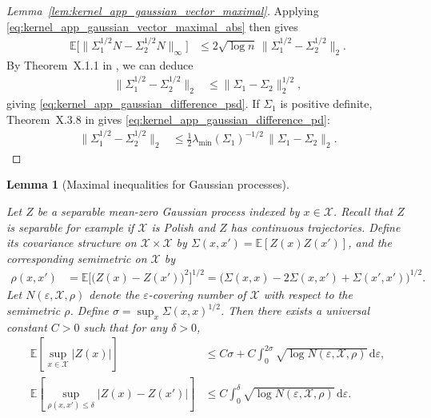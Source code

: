 \documentclass[11pt,lof]{puthesis}
\newcommand{\E}{\ensuremath{\mathbb{E}}}
\newcommand{\cX}{\ensuremath{\mathcal{X}}}
\newcommand{\diff}[1]{\,\mathrm{d}#1}
\theoremstyle{break}
\newtheorem{lemma}{Lemma}[section]
\theoremstyle{proof}
\newtheorem{proof}{Proof}
\begin{document}
\begin{proof}[Lemma~\ref{lem:kernel_app_gaussian_vector_maximal}]
  Applying
  \eqref{eq:kernel_app_gaussian_vector_maximal_abs}
  then gives
  \begin{align*}
    \E\Big[
      \big\|
      \Sigma_1^{1/2} N
      - \Sigma_2^{1/2} N
      \big\|_\infty
    \Big]
    &\leq
    2 \sqrt{\log n} \,
    \big\|
    \Sigma_1^{1/2} - \Sigma_2^{1/2}
    \big\|_2.
  \end{align*}
  By Theorem~X.1.1
  in \citet{bhatia1997matrix},
  we can deduce
  \begin{align*}
    \big\|
    \Sigma_1^{1/2} - \Sigma_2^{1/2}
    \big\|_2
    &\leq
    \big\|
    \Sigma_1 - \Sigma_2
    \big\|_2^{1/2},
  \end{align*}
  giving
  \eqref{eq:kernel_app_gaussian_difference_psd}.
  If $\Sigma_1$
  is positive definite,
  Theorem~X.3.8 in
  \citet{bhatia1997matrix} gives
  \eqref{eq:kernel_app_gaussian_difference_pd}:
  \begin{align*}
    \big\|
    \Sigma_1^{1/2} - \Sigma_2^{1/2}
    \big\|_2
    &\leq
    \frac{1}{2}
    \lambda_{\min}(\Sigma_1)^{-1/2} \,
    \big\|
    \Sigma_1 - \Sigma_2
    \big\|_2.
  \end{align*}
\end{proof}

\begin{lemma}[Maximal inequalities for Gaussian processes]
  \label{lem:kernel_app_gaussian_process_maximal}

  Let $Z$ be a separable
  mean-zero Gaussian process indexed
  by $x \in \cX$.
  Recall that $Z$ is separable for example if
  $\cX$ is Polish and $Z$ has
  continuous trajectories.
  Define its covariance structure on $\cX \times \cX$
  by $\Sigma(x, x') = \E[Z(x) Z(x')]$,
  and the corresponding semimetric on $\cX$ by
  \begin{align*}
    \rho(x,x')
    &=
    \E\big[\big(Z(x) - Z(x')\big)^2\big]^{1/2}
    = \big(\Sigma(x,x)
      - 2 \Sigma(x,x')
    + \Sigma(x',x')\big)^{1/2}.
  \end{align*}
  Let $N(\varepsilon, \cX, \rho)$
  denote the $\varepsilon$-covering number of $\cX$
  with respect to the semimetric $\rho$.
  Define $\sigma = \sup_x \Sigma(x,x)^{1/2}$.
  Then there exists a universal constant $C > 0$
  such that for any $\delta > 0$,
  \begin{align*}
    \E\left[
      \sup_{x \in \cX}
      |Z(x)|
    \right]
    &\leq
    C \sigma
    + C \int_0^{2\sigma}
    \sqrt{\log N(\varepsilon, \cX, \rho)}
    \diff{\varepsilon}, \\
    \E\left[
      \sup_{\rho(x,x') \leq \delta}
      |Z(x) - Z(x')|
    \right]
    &\leq
    C \int_0^{\delta}
    \sqrt{\log N(\varepsilon, \cX, \rho)}
    \diff{\varepsilon}.
  \end{align*}

\end{lemma}
\end{document}

